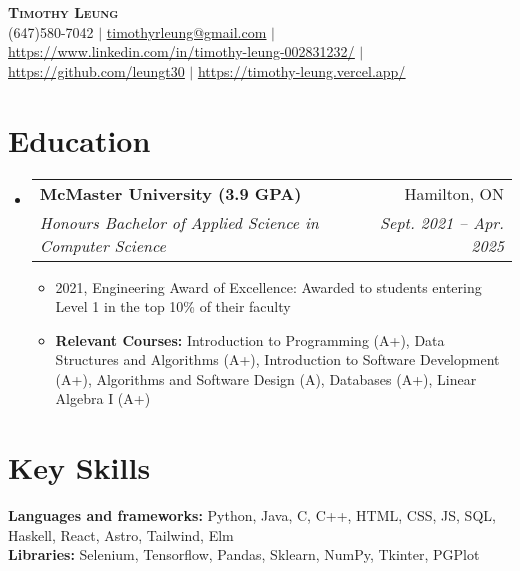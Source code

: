 \documentclass[letterpaper,11pt]{article}
\makeatletter
\newcommand{\resumeItem}[1]{
  \item\small{
    {#1 \vspace{-2pt}}
  }
}
\newcommand{\resumeSubheading}[4]{
  \vspace{-2pt}\item
    \begin{tabular*}{0.97\textwidth}[t]{l@{\extracolsep{\fill}}r}
      \textbf{#1} & #2 \\
      \textit{\small#3} & \textit{\small #4} \\
    \end{tabular*}\vspace{-7pt}
}
\newcommand{\resumeSubHeadingListStart}{\begin{itemize}[leftmargin=0.15in, label={}]}
\newcommand{\resumeSubHeadingListEnd}{\end{itemize}}
\newcommand{\resumeItemListStart}{\begin{itemize}}
\newcommand{\resumeItemListEnd}{\end{itemize}\vspace{-5pt}}
\makeatother
\begin{document}

\begin{center}
    \textbf{\Huge \scshape Timothy Leung} \\ \vspace{1pt}
    \small (647)580-7042 $|$ \href{mailto:timothyrleung@gmail.com}{\underline{timothyrleung@gmail.com}} $|$ 
    \href{https://www.linkedin.com/in/timothy-leung-002831232/}{\underline{https://www.linkedin.com/in/timothy-leung-002831232/}} $|$
    \href{https://github.com/leungt30}{\underline{https://github.com/leungt30}} $|$
    \href{https://timothy-leung.vercel.app/}{\underline{https://timothy-leung.vercel.app/}}
\end{center}


\section{Education}
  \resumeSubHeadingListStart
    \resumeSubheading
      {McMaster University (3.9 GPA)}{Hamilton, ON}
      {Honours Bachelor of Applied Science in Computer Science}{Sept. 2021 -- Apr. 2025}
    \resumeItemListStart
        \resumeItem{2021, Engineering Award of Excellence: Awarded to students entering Level 1 in the top 10\% of their faculty}
        \resumeItem{\textbf{Relevant Courses:} Introduction to Programming (A+), Data Structures and Algorithms (A+), Introduction to Software Development (A+), Algorithms and Software Design (A), Databases (A+), Linear Algebra I (A+)}
    \resumeItemListEnd
  \resumeSubHeadingListEnd

\section{Key Skills}
      \begin{itemize}[leftmargin=0.15in, label={}]
      {\item{
        {\textbf{Languages and frameworks:} Python, Java, C, C++, HTML, CSS, JS, SQL, Haskell, React, Astro, Tailwind, Elm} \\
        {\textbf{Libraries:} Selenium, Tensorflow, Pandas, Sklearn, NumPy,  Tkinter, PGPlot}
    }}
      \end{itemize}
      
\end{document}
